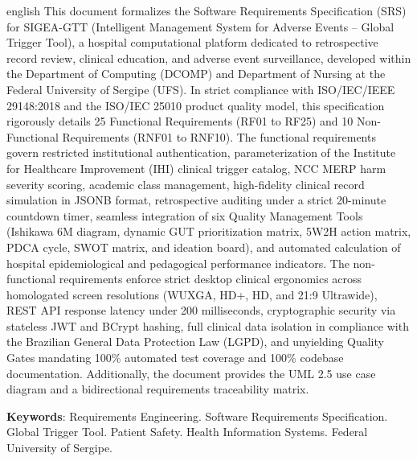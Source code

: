 \begin{resumo}[Abstract]
\begin{otherlanguage*}{english}
This document formalizes the Software Requirements Specification (SRS) for SIGEA-GTT (Intelligent Management System for Adverse Events -- Global Trigger Tool), a hospital computational platform dedicated to retrospective record review, clinical education, and adverse event surveillance, developed within the Department of Computing (DCOMP) and Department of Nursing at the Federal University of Sergipe (UFS). In strict compliance with ISO/IEC/IEEE 29148:2018 and the ISO/IEC 25010 product quality model, this specification rigorously details 25 Functional Requirements (RF01 to RF25) and 10 Non-Functional Requirements (RNF01 to RNF10). The functional requirements govern restricted institutional authentication, parameterization of the Institute for Healthcare Improvement (IHI) clinical trigger catalog, NCC MERP harm severity scoring, academic class management, high-fidelity clinical record simulation in JSONB format, retrospective auditing under a strict 20-minute countdown timer, seamless integration of six Quality Management Tools (Ishikawa 6M diagram, dynamic GUT prioritization matrix, 5W2H action matrix, PDCA cycle, SWOT matrix, and ideation board), and automated calculation of hospital epidemiological and pedagogical performance indicators. The non-functional requirements enforce strict desktop clinical ergonomics across homologated screen resolutions (WUXGA, HD+, HD, and 21:9 Ultrawide), REST API response latency under 200 milliseconds, cryptographic security via stateless JWT and BCrypt hashing, full clinical data isolation in compliance with the Brazilian General Data Protection Law (LGPD), and unyielding Quality Gates mandating 100\% automated test coverage and 100\% codebase documentation. Additionally, the document provides the UML 2.5 use case diagram and a bidirectional requirements traceability matrix.

\vspace{\onelineskip}
\noindent
\textbf{Keywords}: Requirements Engineering. Software Requirements Specification. Global Trigger Tool. Patient Safety. Health Information Systems. Federal University of Sergipe.
\end{otherlanguage*}
\end{resumo}
